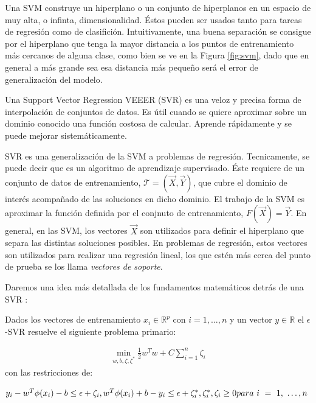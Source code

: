   Una SVM \cite{first_svm} construye un hiperplano o un conjunto de hiperplanos en un espacio
  de muy alta, o infinta, dimensionalidad. Éstos pueden ser usados tanto para
  tareas de regresión como de clasifición. Intuitivamente, una buena separación
  se consigue por el hiperplano que tenga la mayor distancia a los puntos de
  entrenamiento más cercanos de alguna clase, como bien se ve en la
  Figura \ref{fig:svm}, dado que en general
  a más grande sea esa distancia más pequeño será el error de generalización del
  modelo.

  Una Support Vector Regression VEEER (SVR) es una veloz y precisa forma de
  interpolación de conjuntos de datos. Es útil cuando se quiere aproximar sobre
  un dominio conocido una función costosa de calcular. Aprende rápidamente y
  se puede mejorar sistemáticamente.

  SVR es una generalización de la SVM a problemas de regresión. Tecnicamente,
  se puede decir que es un algoritmo de aprendizaje supervisado. Éste
  requiere de un conjunto de datos de entrenamiento,
  $\mathcal{T} = (\vec{X}, \vec{Y})$, que cubre el dominio de interés acompañado
  de las soluciones en dicho dominio. El trabajo de la SVM es aproximar la función
  definida por el conjnuto de entrenamiento, $F(\vec{X}) = \vec{Y}$. En general,
  en las SVM, los vectores $\vec{X}$ son utilizados para definir el hiperplano que
  separa las distintas soluciones posibles. En problemas de regresión, estos
  vectores son utilizados para realizar una regresión lineal, los que estén
  más cerca del punto de prueba se los llama \textit{vectores de soporte}.

  Daremos una idea más detallada de los fundamentos matemáticos detrás de una
  SVR \cite{svr_tutorial}:

  Dados los vectores de entrenamiento $x_{i} \in \mathbb{R}^{p}$ con $i = 1, \dots ,n$
  y un vector $y \in \mathbb{R}$ el $\epsilon$-SVR resuelve el siguiente problema
  primario:

  \begin{align}
    \min\limits_{w, b, \zeta, \zeta^{*}} \frac{1}{2} w^{T} w + C \sum_{i = 1}^{n} \zeta_{i}
  \end{align}
  con las restricciones de:


  \begin{math}
    y_{i} - w^{T} \phi(x_{i}) - b \leq \epsilon + \zeta_{i}, \\
    w^{T} \phi(x_{i}) + b - y_{i} \leq \epsilon + \zeta^{*}_{i}, \\
          \zeta^{*}_{i}, \zeta_{i} \geq 0 \\
    para\ i\ =\ 1,\ \dots, n
  \end{math}

